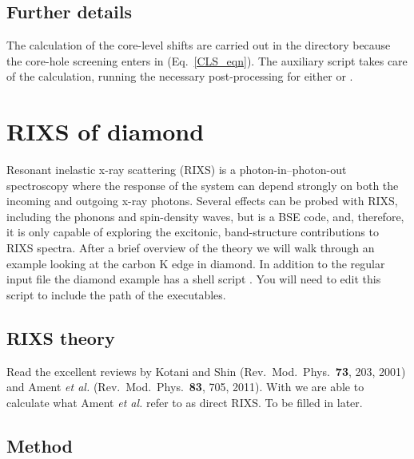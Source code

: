 \documentclass[11pt]{report}
\begin{document}
\subsection{Further details}

The calculation of the core-level shifts are carried out in the  directory because the core-hole screening enters in (Eq.~\ref{CLS_eqn}). 
The auxiliary script  takes care of the calculation, running the necessary post-processing for either  or . 


\section{RIXS of diamond}

Resonant inelastic x-ray scattering (RIXS) is a photon-in--photon-out spectroscopy where the response of the system can depend strongly on both the incoming and outgoing x-ray photons.
Several effects can be probed with RIXS, including the phonons and spin-density waves, but  is a BSE code, and, therefore, it is only capable of exploring the excitonic, band-structure contributions to RIXS spectra. 
After a brief overview of the theory we will walk through an example looking at the carbon K edge in diamond.
In addition to the regular input file the diamond example has a shell script . 
You will need to edit this script to include the path of the  executables.

\subsection{RIXS theory}
Read the excellent reviews by Kotani and Shin (Rev.\ Mod.\ Phys.\ {\bf 73}, 203, 2001) and Ament {\it et al.} (Rev.\ Mod.\ Phys.\ {\bf 83}, 705, 2011). With  we are able to calculate what Ament {\it et al.} refer to as direct RIXS. To be filled in later.

\subsection{Method}
\end{document}
